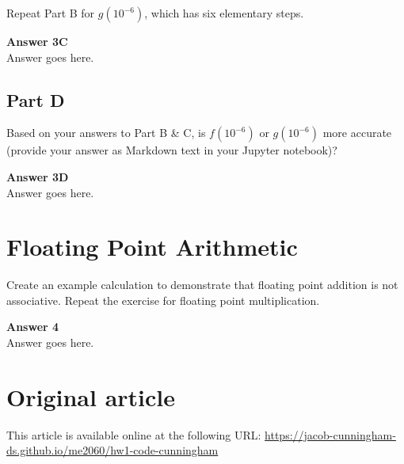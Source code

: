 \documentclass{article}
\begin{document}
Repeat Part B for $g(10^{ -6})$, which has six elementary steps.

\begin{framed}
\textbf{Answer 3C}\\
Answer goes here.
\end{framed}

\subsection{Part D}

Based on your answers to Part B \& C, is $f(10^{ -6})$ or $g(10^{ -6})$ more accurate (provide your answer as Markdown text in your Jupyter notebook)?

\begin{framed}
\textbf{Answer 3D}\\
Answer goes here.
\end{framed}

\section{Floating Point Arithmetic}

Create an example calculation to demonstrate that floating point addition is not associative. Repeat the exercise for floating point multiplication.

\begin{framed}
\textbf{Answer 4}\\
Answer goes here.
\end{framed}


\section*{Original article}
\footnotesize
This article is available online at the following URL: \href{https://jacob-cunningham-ds.github.io/me2060/hw1-code-cunningham}{https://jacob-cunningham-ds.github.io/me2060/hw1-code-cunningham}
\normalsize



\end{document}
